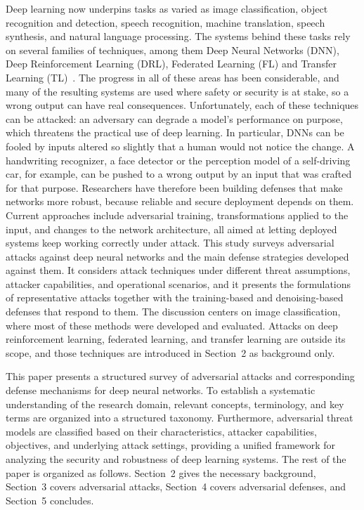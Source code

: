 \documentclass[12pt]{article}
\begin{document}
Deep learning now underpins tasks as varied as image classification, object recognition and detection, speech recognition, machine translation, speech synthesis, and natural language processing. The systems behind these tasks rely on several families of techniques, among them Deep Neural Networks (DNN), Deep Reinforcement Learning (DRL), Federated Learning (FL) and Transfer Learning (TL)~\cite{yuan2019}. The progress in all of these areas has been considerable, and many of the resulting systems are used where safety or security is at stake, so a wrong output can have real consequences. Unfortunately, each of these techniques can be attacked: an adversary can degrade a model's performance on purpose, which threatens the practical use of deep learning. In particular, DNNs can be fooled by inputs altered so slightly that a human would not notice the change. A handwriting recognizer, a face detector or the perception model of a self-driving car, for example, can be pushed to a wrong output by an input that was crafted for that purpose. Researchers have therefore been building defenses that make networks more robust, because reliable and secure deployment depends on them. Current approaches include adversarial training, transformations applied to the input, and changes to the network architecture, all aimed at letting deployed systems keep working correctly under attack. This study surveys adversarial attacks against deep neural networks and the main defense strategies developed against them. It considers attack techniques under different threat assumptions, attacker capabilities, and operational scenarios, and it presents the formulations of representative attacks together with the training-based and denoising-based defenses that respond to them. The discussion centers on image classification, where most of these methods were developed and evaluated. Attacks on deep reinforcement learning, federated learning, and transfer learning are outside its scope, and those techniques are introduced in Section~2 as background only.

This paper presents a structured survey of adversarial attacks and corresponding defense mechanisms for deep neural networks. To establish a systematic understanding of the research domain, relevant concepts, terminology, and key terms are organized into a structured taxonomy. Furthermore, adversarial threat models are classified based on their characteristics, attacker capabilities, objectives, and underlying attack settings, providing a unified framework for analyzing the security and robustness of deep learning systems. The rest of the paper is organized as follows. Section~2 gives the necessary background, Section~3 covers adversarial attacks, Section~4 covers adversarial defenses, and Section~5 concludes.
\end{document}
